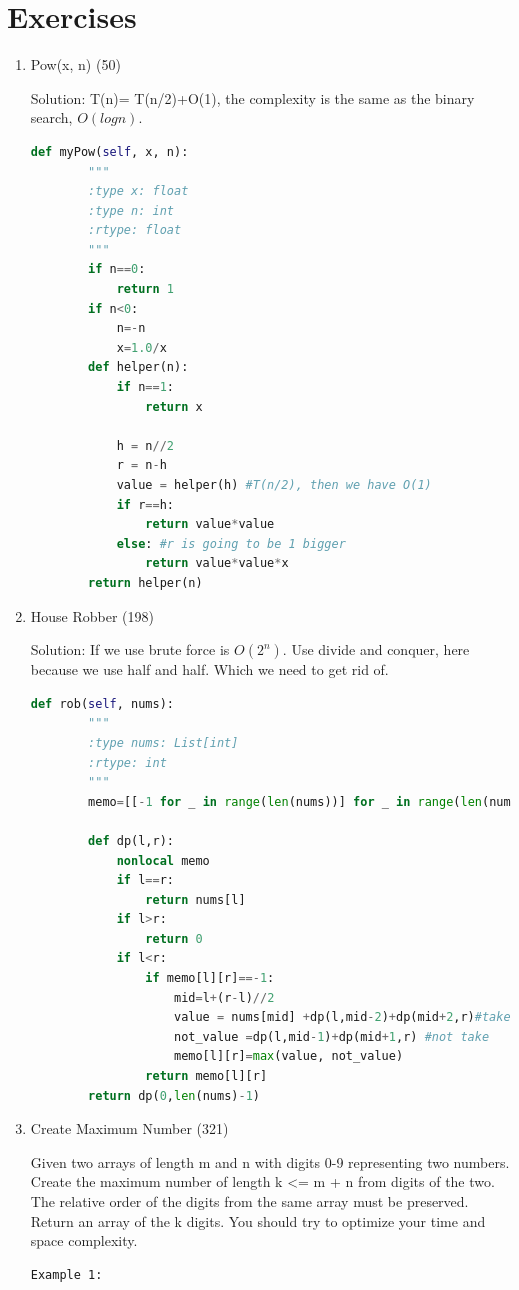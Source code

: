 \documentclass[../algorithms.tex]{subfiles}
\begin{document}
\section{Exercises}
\begin{enumerate}
    \item Pow(x, n) (50)
    
    Solution: T(n)= T(n/2)+O(1), the complexity is the same as the binary search, $O(logn)$.
    \begin{lstlisting}[language=Python]
    def myPow(self, x, n):
        """
        :type x: float
        :type n: int
        :rtype: float
        """
        if n==0:
            return 1
        if n<0:
            n=-n
            x=1.0/x
        def helper(n):
            if n==1:
                return x
            
            h = n//2
            r = n-h
            value = helper(h) #T(n/2), then we have O(1)
            if r==h:                
                return value*value
            else: #r is going to be 1 bigger
                return value*value*x
        return helper(n)
    \end{lstlisting}
    
    \item House Robber (198)
    
    Solution: If we use brute force is $O(2^n)$. Use divide and conquer, here because we use half and half. Which we need to get rid of. 
\begin{lstlisting}[language = Python]
def rob(self, nums):
        """
        :type nums: List[int]
        :rtype: int
        """
        memo=[[-1 for _ in range(len(nums))] for _ in range(len(nums))]
        
        def dp(l,r):
            nonlocal memo
            if l==r:
                return nums[l]
            if l>r:
                return 0
            if l<r:
                if memo[l][r]==-1:
                    mid=l+(r-l)//2
                    value = nums[mid] +dp(l,mid-2)+dp(mid+2,r)#take this value
                    not_value =dp(l,mid-1)+dp(mid+1,r) #not take
                    memo[l][r]=max(value, not_value)
                return memo[l][r]
        return dp(0,len(nums)-1)
\end{lstlisting}

\item Create Maximum Number (321) 

Given two arrays of length m and n with digits 0-9 representing two numbers. Create the maximum number of length k <= m + n from digits of the two. The relative order of the digits from the same array must be preserved. Return an array of the k digits. You should try to optimize your time and space complexity.
\begin{lstlisting}
Example 1:


\end{lstlisting}
\end{enumerate}
\end{document}
